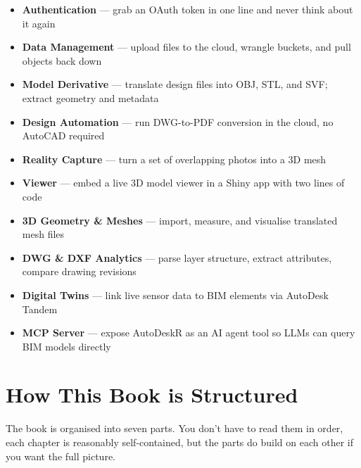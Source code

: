 \documentclass[
  11pt,
  letterpaper,
  DIV=11,
  numbers=noendperiod]{scrreprt}
\providecommand{\tightlist}{%
  \setlength{\itemsep}{0pt}\setlength{\parskip}{0pt}}
\begin{document}
\begin{itemize}
\tightlist
\item
  \textbf{Authentication} --- grab an OAuth token in one line and never
  think about it again
\item
  \textbf{Data Management} --- upload files to the cloud, wrangle
  buckets, and pull objects back down
\item
  \textbf{Model Derivative} --- translate design files into OBJ, STL,
  and SVF; extract geometry and metadata
\item
  \textbf{Design Automation} --- run DWG-to-PDF conversion in the cloud,
  no AutoCAD required
\item
  \textbf{Reality Capture} --- turn a set of overlapping photos into a
  3D mesh
\item
  \textbf{Viewer} --- embed a live 3D model viewer in a Shiny app with
  two lines of code
\item
  \textbf{3D Geometry \& Meshes} --- import, measure, and visualise
  translated mesh files
\item
  \textbf{DWG \& DXF Analytics} --- parse layer structure, extract
  attributes, compare drawing revisions
\item
  \textbf{Digital Twins} --- link live sensor data to BIM elements via
  AutoDesk Tandem
\item
  \textbf{MCP Server} --- expose AutoDeskR as an AI agent tool so LLMs
  can query BIM models directly
\end{itemize}

\section*{How This Book is
Structured}\label{how-this-book-is-structured}


The book is organised into seven parts. You don't have to read them in
order, each chapter is reasonably self-contained, but the parts do build
on each other if you want the full picture.
\end{document}

